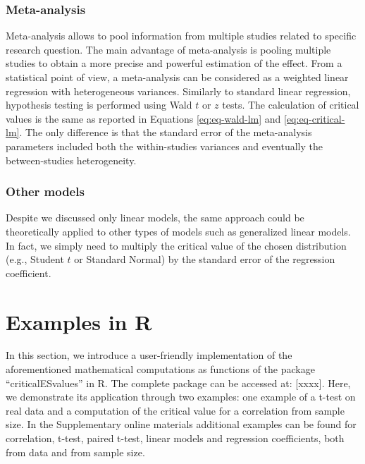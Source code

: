 \documentclass[
  man]{apa7}
\begin{document}
\hypertarget{meta-analysis}{%
\subsubsection{Meta-analysis}\label{meta-analysis}}

Meta-analysis allows to pool information from multiple studies related to specific research question. The main advantage of meta-analysis is pooling multiple studies to obtain a more precise and powerful estimation of the effect. From a statistical point of view, a meta-analysis can be considered as a weighted linear regression with heterogeneous variances. Similarly to standard linear regression, hypothesis testing is performed using Wald \(t\) or \(z\) tests. The calculation of critical values is the same as reported in Equations \eqref{eq:eq-wald-lm} and \eqref{eq:eq-critical-lm}. The only difference is that the standard error of the meta-analysis parameters included both the within-studies variances and eventually the between-studies heterogeneity.

\hypertarget{other-models}{%
\subsubsection{Other models}\label{other-models}}

Despite we discussed only linear models, the same approach could be theoretically applied to other types of models such as generalized linear models. In fact, we simply need to multiply the critical value of the chosen distribution (e.g., Student \(t\) or Standard Normal) by the standard error of the regression coefficient.

\hypertarget{examples-in-r}{%
\section{Examples in R}\label{examples-in-r}}

In this section, we introduce a user-friendly implementation of the aforementioned mathematical computations as functions of the package ``criticalESvalues'' in R. The complete package can be accessed at: {[}xxxx{]}. Here, we demonstrate its application through two examples: one example of a t-test on real data and a computation of the critical value for a correlation from sample size. In the Supplementary online materials additional examples can be found for correlation, t-test, paired t-test, linear models and regression coefficients, both from data and from sample size.
\end{document}
